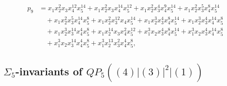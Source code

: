\documentclass[reqno]{amsart}
\theoremstyle{plain}
\theoremstyle{definition}
\theoremstyle{plain}
\theoremstyle{definition}
\numberwithin{equation}{section}
\begin{document}
\begin{align*}
p_9 &= x_1x_2^{2}x_3x_4^{12}x_5^{14} + x_1x_2^{2}x_3x_4^{14}x_5^{12} + x_1x_2^{2}x_3^{4}x_4^{9}x_5^{14} + x_1x_2^{2}x_3^{5}x_4^{8}x_5^{14}\\ &\quad + x_1x_2^{2}x_3^{5}x_4^{14}x_5^{8} + x_1x_2^{2}x_3^{12}x_4x_5^{14} + x_1x_2^{3}x_3^{4}x_4^{8}x_5^{14} + x_1x_2^{3}x_3^{4}x_4^{14}x_5^{8}\\ &\quad + x_1x_2^{3}x_3^{14}x_4^{4}x_5^{8} + x_1x_2^{14}x_3x_4^{2}x_5^{12} + x_1^{3}x_2x_3^{4}x_4^{8}x_5^{14} + x_1^{3}x_2x_3^{4}x_4^{14}x_5^{8}\\ &\quad + x_1^{3}x_2x_3^{14}x_4^{4}x_5^{8} + x_1^{3}x_2^{13}x_3^{2}x_4^{4}x_5^{8},
\end{align*}

\subsection{$\Sigma_5$-invariants of $QP_5((4)|(3)|^2|(1))$}\label{s54}\
\end{document}
